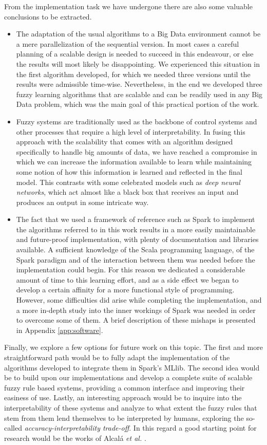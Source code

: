 From the implementation task we have undergone there are also some valuable conclusions to be extracted.

\begin{itemize}
  \item The adaptation of the usual algorithms to a Big Data environment cannot be a mere parallelization of the sequential version. In most cases a careful planning of a scalable design is needed to succeed in this endeavour, or else the results will most likely be disappointing. We experienced this situation in the first algorithm developed, for which we needed three versions until the results were admissible time-wise. Nevertheless, in the end we developed three fuzzy learning algorithms that are scalable and can be readily used in any Big Data problem, which was the main goal of this practical portion of the work.
  \item Fuzzy systems are traditionally used as the backbone of control systems and other processes that require a high level of interpretability. In fusing this approach with the scalability that comes with an algorithm designed specifically to handle big amounts of data, we have reached a compromise in which we can increase the information available to learn while maintaining some notion of how this information is learned and reflected in the final model. This contrasts with some celebrated models such as \textit{deep neural networks}, which act almost like a black box that receives an input and produces an output in some intricate way.
  \item The fact that we used a framework of reference such as Spark to implement the algorithms referred to in this work results in a more easily maintainable and future-proof implementation, with plenty of documentation and libraries available. A sufficient knowledge of the Scala programming language, of the Spark paradigm and of the interaction between them was needed before the implementation could begin. For this reason we dedicated a considerable amount of time to this learning effort, and as a side effect we began to develop a certain affinity for a more functional style of programming. However, some difficulties did arise while completing the implementation, and a more in-depth study into the inner workings of Spark was needed in order to overcome some of them. A brief description of these mishaps is presented in Appendix \ref{app:software}.
\end{itemize}

Finally, we explore a few options for future work on this topic. The first and more straightforward path would be to fully adapt the implementation of the algorithms developed to integrate them in Spark's MLlib. The second idea would be to build upon our implementations and develop a complete suite of scalable fuzzy rule based systems, providing a common interface and improving their easiness of use. Lastly, an interesting approach would be to inquire into the interpretability of these systems and analyze to what extent the fuzzy rules that stem from them lend themselves to be interpreted by humans, exploring the so-called \textit{accuracy-interpretability trade-off}. In this regard a good starting point for research would be the works of Alcalá \textit{et al.} \cite{hybrid2006alcala,gacto2011interpretability}.

